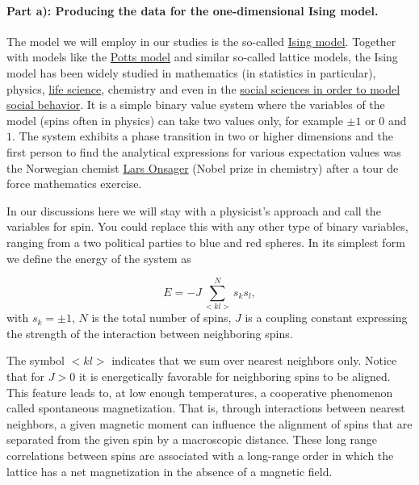 \documentclass[%
oneside,                 %
final,                   %
10pt]{article}
\begin{document}
\paragraph{Part a): Producing the data for the one-dimensional Ising model.}
The model we will employ in our studies is the so-called \href{{https://en.wikipedia.org/wiki/Ising_model}}{Ising
model}.  Together with
models like the \href{{https://en.wikipedia.org/wiki/Potts_model}}{Potts
model} and similar
so-called lattice models, the Ising model has been widely studied in
mathematics (in statistics in particular), physics, \href{{https://journals.aps.org/pre/abstract/10.1103/PhysRevE.93.062402}}{life
science},
chemistry and even in the \href{{https://www.springer.com/gp/book/9781461420316}}{social sciences in order to model social
behavior}. It is a
simple binary value system where the variables of the model (spins often in
physics) can take two values only, for example $\pm 1$ or $0$ and $1$.
The system exhibits a phase transition in two or higher dimensions and
the first person to find the analytical expressions for various
expectation values was the Norwegian chemist \href{{https://en.wikipedia.org/wiki/Lars_Onsager}}{Lars
Onsager} (Nobel prize in
chemistry) after a tour de force mathematics exercise.

In our discussions here we will stay with a physicist's approach and
call the variables for spin. You could replace this with any other
type of binary variables, ranging from a two political parties to blue
and red spheres.  In its simplest form we define the energy of the
system as

\begin{equation*}
  E=-J\sum_{<kl>}^{N}s_ks_l,
\end{equation*}
with  $s_k=\pm 1$, $N$ is the total number of spins,
$J$ is a coupling constant expressing the strength of the interaction
between neighboring spins.

The symbol $<kl>$ indicates that we sum over nearest
neighbors only.
Notice that for $J>0$ it is energetically favorable for neighboring spins
to be aligned. This feature leads to, at low enough temperatures,
a cooperative phenomenon called spontaneous magnetization. That is,
through interactions between nearest neighbors, a given magnetic
moment can influence the alignment of spins  that are separated
from the given spin by a macroscopic distance. These long range correlations
between spins are associated with a long-range order in which
the lattice has a net magnetization in the absence of a magnetic field.
\end{document}
